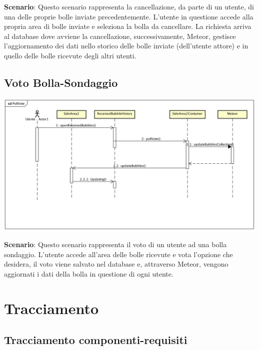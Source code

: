 \textbf{Scenario}: 
Questo scenario rappresenta la cancellazione, da parte di un utente, di una delle proprie bolle 	inviate precedentemente. L’utente in questione accede alla propria area di bolle inviate e 	seleziona la bolla da cancellare. La richiesta arriva al database dove avviene la cancellazione, 	successivamente, Meteor, gestisce l’aggiornamento dei dati nello storico delle bolle inviate 	(dell’utente attore) e in quello delle bolle ricevute degli altri utenti. 
\newpage

\subsection{Voto Bolla-Sondaggio}

\begin{center}
	\includegraphics[scale=0.4]{img/PollVote.png}
\end{center}



\textbf{Scenario}: 
Questo scenario rappresenta il voto di un utente ad una bolla sondaggio.
L’utente accede all’area delle bolle ricevute e vota l’opzione che desidera, il voto viene salvato 	nel database e, attraverso Meteor, vengono aggiornati i dati della bolla in questione di ogni 	utente. \\

\section{Tracciamento}

\subsection{Tracciamento componenti-requisiti}

